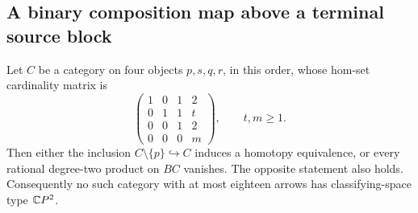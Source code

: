 \subsection{A binary composition map above a terminal source block}

\begin{proposition}
\label{CP2:A-four-binary-map-dichotomy}
Let $C$ be a category on four objects $p,s,q,r$, in this
order, whose hom-set cardinality matrix is
\[
\begin{pmatrix}
1&0&1&2\\
0&1&1&t\\
0&0&1&2\\
0&0&0&m
\end{pmatrix},\qquad t,m\geq1.
\]
Then either the inclusion
$C\setminus\{p\}\hookrightarrow C$ induces a homotopy
equivalence, or every rational degree-two product on
$BC$ vanishes. The opposite statement also holds.
Consequently no such category with at most eighteen
arrows has classifying-space type $\mathbb{C}P^2$.
\end{proposition}
